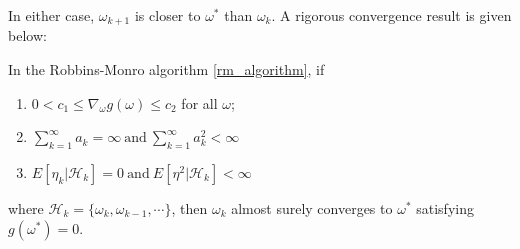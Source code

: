   In either case, $\omega_{k+1}$ is closer to $\omega^{*}$ than $\omega_{k}$. A rigorous convergence result is given
  below:
  \begin{theorem}
    \label{rm:1}
    In the Robbins-Monro algorithm \ref{rm_algorithm}, if
    \begin{enumerate}
      \item
            $0<c_{1} \le \nabla_{\omega}g(\omega) \le c_{2}$ for all $\omega$;
      \item
            $\sum_{k=1}^{\infty}a_{k}=\infty \ \text{and} \ \sum_{k=1}^{\infty}a_{k}^{2} < \infty$
      \item
            $E[\eta_{k}| \mathcal{H}_{k}] = 0 \ \text{and} \ E[\eta^{2}|\mathcal{H}_{k}]<\infty$
    \end{enumerate}
    where $\mathcal{H}_{k}= \{\omega_{k},\omega_{k-1},\cdots \}$, then $\omega_{k}$ almost surely converges to
    $\omega^{*}$ satisfying $g(\omega^{*})=0$.
  \end{theorem}


